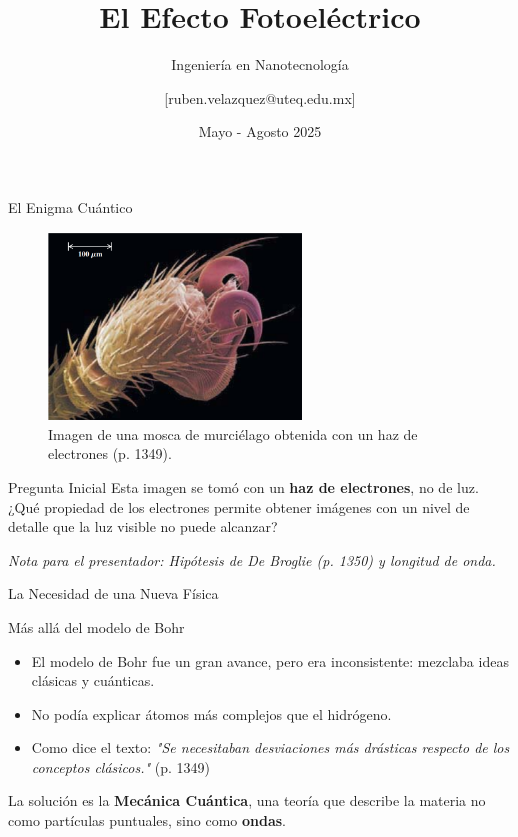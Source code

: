 \documentclass[12pt,aspectratio=169]{beamer}
\title[]{El Efecto Fotoeléctrico}
\subtitle{Ingeniería en Nanotecnología}
\author{[ruben.velazquez@uteq.edu.mx]}
\institute[UTEQ]{Universidad Tecnológica de Querétaro}
\date{Mayo - Agosto 2025}
\begin{document}
	
	\begin{frame}
		\titlepage
	\end{frame}
	
	\begin{frame}{El Enigma Cuántico}
		\begin{figure}
			\includegraphics[width=0.6\textwidth]{../Imagenes/mosca} %
			\caption{Imagen de una mosca de murciélago obtenida con un haz de electrones (p. 1349).}
		\end{figure}
		
	\end{frame}
	
	\begin{frame}
		\begin{block}{Pregunta Inicial}
			Esta imagen se tomó con un \textbf{haz de electrones}, no de luz.
			\vspace{0.5em}
			¿Qué propiedad de los electrones permite obtener imágenes con un nivel de detalle que la luz visible no puede alcanzar?
		\end{block}
		\begin{flushright}
			\tiny{\textit{Nota para el presentador: Hipótesis de De Broglie (p. 1350) y longitud de onda.}}
		\end{flushright}
	\end{frame}
	\begin{frame}{La Necesidad de una Nueva Física}
		\begin{block}{Más allá del modelo de Bohr}
			\begin{itemize}
				\item El modelo de Bohr fue un gran avance, pero era inconsistente: mezclaba ideas clásicas y cuánticas.
				\item No podía explicar átomos más complejos que el hidrógeno.
				\item Como dice el texto: \textit{"Se necesitaban desviaciones más drásticas respecto de los conceptos clásicos."} (p. 1349)
			\end{itemize}
		\end{block}
		\pause
		La solución es la \textbf{Mecánica Cuántica}, una teoría que describe la materia no como partículas puntuales, sino como \textbf{ondas}.
	\end{frame}
\end{document}
